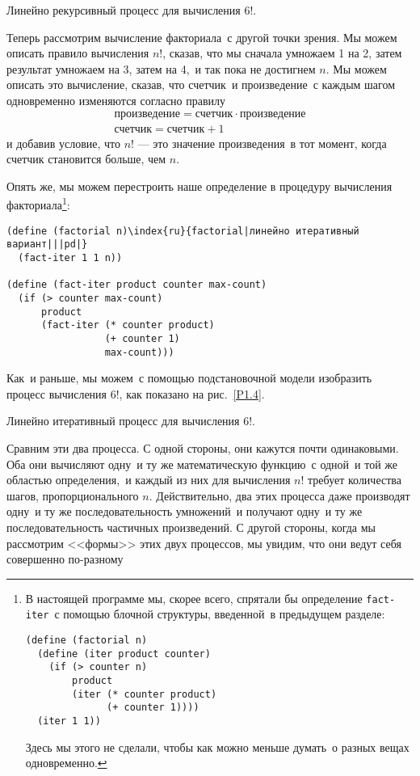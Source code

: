 \begin{cntrfig}

\caption{Линейно рекурсивный процесс для вычисления 6!.}
\label{P1.3}
\end{cntrfig}

Теперь рассмотрим вычисление факториала~с другой точки
зрения. Мы можем описать правило вычисления $n!$, сказав,
что мы сначала умножаем 1 на 2, затем результат умножаем на 3, затем
на 4,~и так пока не достигнем $n$. Мы можем описать это
вычисление, сказав, что счетчик~и произведение~с каждым шагом
одновременно изменяются согласно правилу
$$
\begin{array}{c}
  \mbox{произведение} = \mbox{счетчик} \cdot \mbox{произведение} \\
  \mbox{счетчик} = \mbox{счетчик} + 1
\end{array}
$$
и добавив условие, что $n!$ --- это значение произведения~в 
тот момент, когда счетчик становится больше, чем $n$.

Опять же, мы можем перестроить  наше определение в
процедуру вычисления факториала\footnote{В настоящей программе мы,
  скорее всего, спрятали бы определение {\tt fact-iter}~с помощью блочной структуры,
  введенной~в предыдущем разделе:
  
\begin{Verbatim}
(define (factorial n)
  (define (iter product counter)
    (if (> counter n)
        product
        (iter (* counter product)
              (+ counter 1))))
  (iter 1 1))
\end{Verbatim}
  Здесь мы этого не сделали, чтобы как можно меньше думать~о разных
  вещах одновременно.}:

\begin{Verbatim}[fontsize=\small]
(define (factorial n)\index{ru}{factorial|линейно итеративный вариант|||pd|}
  (fact-iter 1 1 n))

(define (fact-iter product counter max-count)
  (if (> counter max-count)
      product
      (fact-iter (* counter product)
                 (+ counter 1)
                 max-count)))
\end{Verbatim}
Как~и раньше, мы можем~с помощью подстановочной модели
изобразить процесс вычисления 6!, как показано на рис.~\ref{P1.4}.


\begin{cntrfig}

\caption{Линейно итеративный процесс для
вычисления 6!.}
\label{P1.4}
\end{cntrfig}

Сравним эти два процесса. С одной стороны, они
кажутся почти одинаковыми.  Оба они вычисляют одну~и ту же
математическую функцию~с одной~и той же областью определения,~и каждый 
из них для вычисления $n!$ требует количества шагов,
пропорционального $n$.  Действительно, два этих процесса
даже производят одну~и ту же последовательность умножений~и получают
одну~и ту же последовательность частичных произведений. С другой
стороны, когда мы рассмотрим 
%
%
<<формы>> этих двух процессов, мы увидим, 
что они ведут себя совершенно по-разному\-


